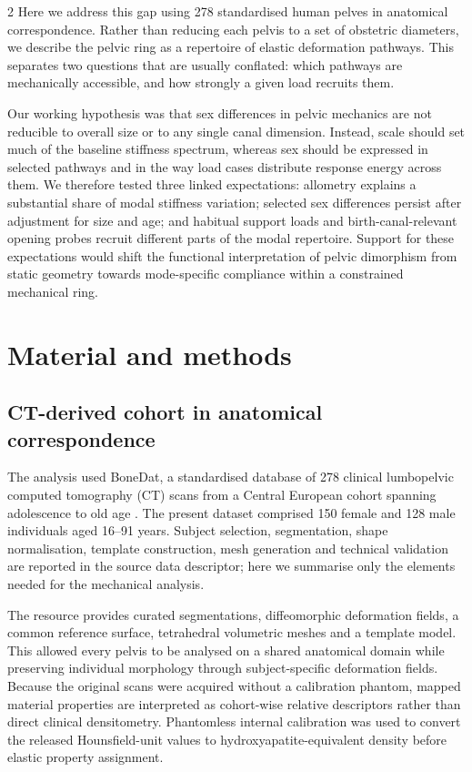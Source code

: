 \documentclass[openacc]{rsproca_new}
\begin{document}
\begin{multicols}{2}
Here we address this gap using 278 standardised human pelves in anatomical correspondence. Rather than reducing each pelvis to a set of obstetric diameters, we describe the pelvic ring as a repertoire of elastic deformation pathways. This separates two questions that are usually conflated: which pathways are mechanically accessible, and how strongly a given load recruits them.

Our working hypothesis was that sex differences in pelvic mechanics are not reducible to overall size or to any single canal dimension. Instead, scale should set much of the baseline stiffness spectrum, whereas sex should be expressed in selected pathways and in the way load cases distribute response energy across them. We therefore tested three linked expectations: allometry explains a substantial share of modal stiffness variation; selected sex differences persist after adjustment for size and age; and habitual support loads and birth-canal-relevant opening probes recruit different parts of the modal repertoire. Support for these expectations would shift the functional interpretation of pelvic dimorphism from static geometry towards mode-specific compliance within a constrained mechanical ring.


\section{Material and methods}

\subsection{CT-derived cohort in anatomical correspondence}

The analysis used BoneDat, a standardised database of 278 clinical lumbopelvic computed tomography (CT) scans from a Central European cohort spanning adolescence to old age \cite{HenysKuchar2025}. The present dataset comprised 150 female and 128 male individuals aged 16--91 years. Subject selection, segmentation, shape normalisation, template construction, mesh generation and technical validation are reported in the source data descriptor; here we summarise only the elements needed for the mechanical analysis.

The resource provides curated segmentations, diffeomorphic deformation fields, a common reference surface, tetrahedral volumetric meshes and a template model. This allowed every pelvis to be analysed on a shared anatomical domain while preserving individual morphology through subject-specific deformation fields. Because the original scans were acquired without a calibration phantom, mapped material properties are interpreted as cohort-wise relative descriptors rather than direct clinical densitometry. Phantomless internal calibration was used to convert the released Hounsfield-unit values to hydroxyapatite-equivalent density before elastic property assignment.


\end{multicols}
\end{document}
